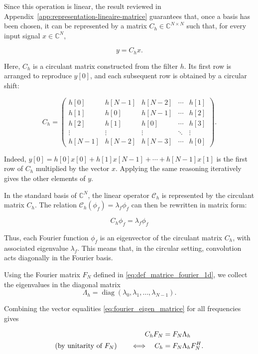 Since this operation is linear, the result reviewed in Appendix~\ref{app:representation-lineaire-matrice}
guarantees that, once a basis has been chosen, it can be represented by a matrix
$C_h \in \mathbb{C}^{N \times N}$ such that, for every input signal $x \in \mathbb{C}^N$,

$$
y = C_h x.
$$

Here, $C_h$ is a circulant matrix constructed from the filter $h$. Its first row is arranged to reproduce $y[0]$,
and each subsequent row is obtained by a circular shift:

$$
C_h =
\begin{pmatrix}
h[0] & h[N-1] & h[N-2] & \cdots & h[1] \\
h[1] & h[0] & h[N-1] & \cdots & h[2] \\
h[2] & h[1] & h[0] & \cdots & h[3] \\
\vdots & \vdots & \vdots & \ddots & \vdots \\
h[N-1] & h[N-2] & h[N-3] & \cdots & h[0]
\end{pmatrix}.
$$

Indeed, $y[0] = h[0]x[0] + h[1]x[N-1] + \cdots + h[N-1]x[1]$ is the first row of $C_h$
multiplied by the vector $x$. Applying the same reasoning iteratively gives the other elements of $y$.

\vspace{0.5cm}

In the standard basis of $\mathbb{C}^N$, the linear operator $\mathcal{C}_h$
is represented by the circulant matrix $C_h$. The relation
$\mathcal{C}_h(\phi_f) = \lambda_f \phi_f$ can then be rewritten in matrix form:

\begin{equation}
    C_h \phi_f = \lambda_f \phi_f
    \label{eq:fourier_eigen_matrice}
\end{equation}

Thus, each Fourier function $\phi_f$ is an eigenvector of the circulant matrix $C_h$,
with associated eigenvalue $\lambda_f$. This means that, in the circular
setting, convolution acts diagonally in the Fourier basis.

Using the Fourier matrix $F_N$ defined in \eqref{eq:def_matrice_fourier_1d},
we collect the eigenvalues in the diagonal matrix
$$
\Lambda_h =
\operatorname{diag}(\lambda_0,\lambda_1,\ldots,\lambda_{N-1}).
$$

Combining the vector equalities \eqref{eq:fourier_eigen_matrice} for all frequencies gives

\begin{align}
C_h F_N &= F_N \Lambda_h \notag \\
\text{(by unitarity of \(F_N\))}\qquad
\Longleftrightarrow\quad
C_h &= F_N \Lambda_h F_N^H.
\end{align}

